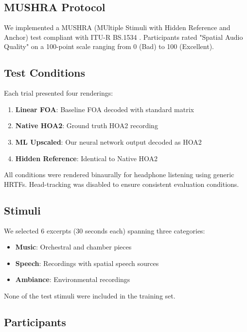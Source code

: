 \documentclass[10pt,twocolumn]{article}
\begin{document}
\subsection{MUSHRA Protocol}

We implemented a MUSHRA (MUltiple Stimuli with Hidden Reference and Anchor) test compliant with ITU-R BS.1534 \cite{itur2015mushra}. Participants rated "Spatial Audio Quality" on a 100-point scale ranging from 0 (Bad) to 100 (Excellent).

\subsection{Test Conditions}

Each trial presented four renderings:
\begin{enumerate}
    \item \textbf{Linear FOA}: Baseline FOA decoded with standard matrix
    \item \textbf{Native HOA2}: Ground truth HOA2 recording
    \item \textbf{ML Upscaled}: Our neural network output decoded as HOA2
    \item \textbf{Hidden Reference}: Identical to Native HOA2
\end{enumerate}

All conditions were rendered binaurally for headphone listening using generic HRTFs. Head-tracking was disabled to ensure consistent evaluation conditions.

\subsection{Stimuli}

We selected 6 excerpts (30 seconds each) spanning three categories:
\begin{itemize}
    \item \textbf{Music}: Orchestral and chamber pieces
    \item \textbf{Speech}: Recordings with spatial speech sources
    \item \textbf{Ambiance}: Environmental recordings
\end{itemize}

None of the test stimuli were included in the training set.

\subsection{Participants}
\end{document}

